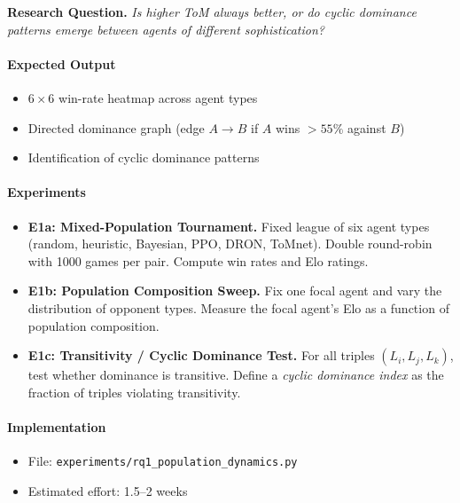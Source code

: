 \documentclass{article}
\begin{document}
\textbf{Research Question.}  
\emph{Is higher ToM always better, or do cyclic dominance patterns emerge between agents of different sophistication?}

\paragraph{Expected Output}
\begin{itemize}
    \item $6 \times 6$ win-rate heatmap across agent types
    \item Directed dominance graph (edge $A \to B$ if $A$ wins $>55\%$ against $B$)
    \item Identification of cyclic dominance patterns
\end{itemize}

\paragraph{Experiments}
\begin{itemize}
    \item \textbf{E1a: Mixed-Population Tournament.}  
    Fixed league of six agent types (random, heuristic, Bayesian, PPO, DRON, ToMnet).  
    Double round-robin with 1000 games per pair. Compute win rates and Elo ratings.

    \item \textbf{E1b: Population Composition Sweep.}  
    Fix one focal agent and vary the distribution of opponent types.  
    Measure the focal agent’s Elo as a function of population composition.

    \item \textbf{E1c: Transitivity / Cyclic Dominance Test.}  
    For all triples $(L_i, L_j, L_k)$, test whether dominance is transitive.  
    Define a \emph{cyclic dominance index} as the fraction of triples violating transitivity.
\end{itemize}

\paragraph{Implementation}
\begin{itemize}
    \item File: \texttt{experiments/rq1\_population\_dynamics.py}
    \item Estimated effort: 1.5--2 weeks
\end{itemize}

\end{document}
